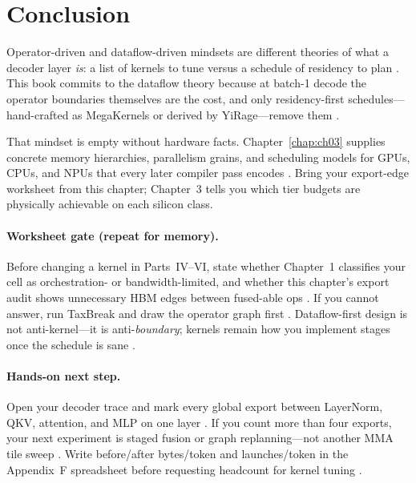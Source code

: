 \section{Conclusion}
\label{sec:ch02_conclusion}

Operator-driven and dataflow-driven mindsets are different theories of what a decoder layer \emph{is}: a list of kernels to tune versus a schedule of residency to plan \citep{chen2020compilerbasedhardw,dlbook}.
This book commits to the dataflow theory because at batch-1 decode the operator boundaries themselves are the cost, and only residency-first schedules---hand-crafted as MegaKernels or derived by YiRage---remove them \citep{yirage2026,memoryfloor2026}.

That mindset is empty without hardware facts.
Chapter~\ref{chap:ch03} supplies concrete memory hierarchies, parallelism grains, and scheduling models for GPUs, CPUs, and NPUs that every later compiler pass encodes \citep{nvidia2022hopper,amd2024xdna,amd2024aie}.
Bring your export-edge worksheet from this chapter; Chapter~3 tells you which tier budgets are physically achievable on each silicon class.

\paragraph{Worksheet gate (repeat for memory).}
Before changing a kernel in Parts~IV--VI, state whether Chapter~1 classifies your cell as orchestration- or bandwidth-limited, and whether this chapter's export audit shows unnecessary HBM edges between fused-able ops \citep{taxbreak2026,memoryfloor2026}.
If you cannot answer, run TaxBreak and draw the operator graph first \citep{taxbreak2026}.
Dataflow-first design is not anti-kernel---it is anti-\emph{boundary}; kernels remain how you implement stages once the schedule is sane \citep{yirage2026,dao2022flashattention}.

\paragraph{Hands-on next step.}
Open your decoder trace and mark every global export between LayerNorm, QKV, attention, and MLP on one layer \citep{memoryfloor2026}.
If you count more than four exports, your next experiment is staged fusion or graph replanning---not another MMA tile sweep \citep{taxbreak2026,yirage2026}.
Write before/after bytes/token and launches/token in the Appendix~F spreadsheet before requesting headcount for kernel tuning \citep{patel2025llminference}.

